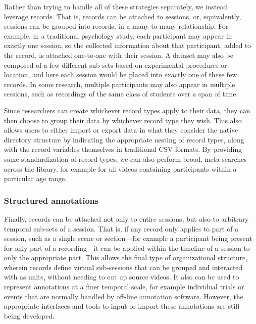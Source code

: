 \documentclass{sig-alternate}
\begin{document}
Rather than trying to handle all of these strategies separately, we instead leverage records.
That is, records can be attached to sessions, or, equivalently, sessions can be grouped into records, in a many-to-many relationship.
For example, in a traditional psychology study, each participant may appear in exactly one session, so the collected information about that participant, added to the record, is attached one-to-one with their session.
A dataset may also be composed of a few different sub-sets based on experimental procedures or location, and here each session would be placed into exactly one of these few records.
In some research, multiple participants may also appear in multiple sessions, such as recordings of the same class of students over a span of time.

Since researchers can create whichever record types apply to their data, they can then choose to group their data by whichever record type they wish.
This also allows users to either import or export data in what they consider the native directory structure by indicating the appropriate nesting of record types, along with the record variables themselves in traditional CSV formats.
By providing some standardization of record types, we can also perform broad, meta-searches across the library, for example for all videos containing participants within a particular age range.

\subsubsection*{Structured annotations}
Finally, records can be attached not only to entire sessions, but also to arbitrary temporal sub-sets of a session.
That is, if any record only applies to part of a session, such as a single scene or section---for example a participant being present for only part of a recording---it can be applied within the timeline of a session to only the appropriate part.
This allows the final type of organizational structure, wherein records define virtual sub-sessions that can be grouped and interacted with as units, without needing to cut up source videos.
It also can be used to represent annotations at a finer temporal scale, for example individual trials or events that are normally handled by off-line annotation software.
However, the appropriate interfaces and tools to input or import these annotations are still being developed.
\end{document}
